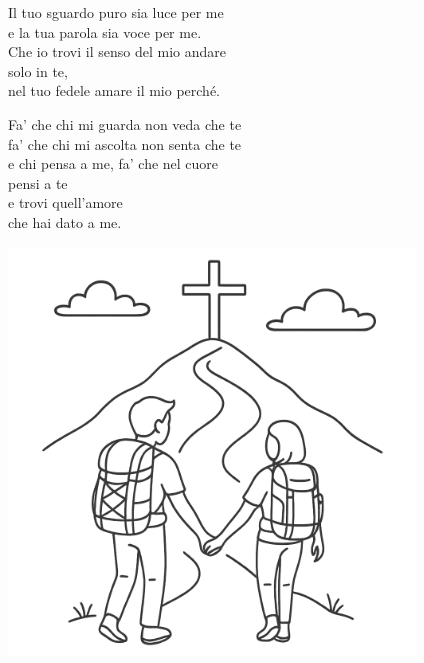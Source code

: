 	\begin{mystrofe}
		Il tuo sguardo puro sia luce per me \\
		e la tua parola sia voce per me. \\
		Che io trovi il senso del mio andare \\
		solo in te, \\
		nel tuo fedele amare il mio perché. \\
	\end{mystrofe}

	\begin{mystrofe}
		\ritornello{}
	\end{mystrofe}

	\begin{mystrofe}
		Fa' che chi mi guarda non veda che te \\
		fa' che chi mi ascolta non senta che te \\
		e chi pensa a me, fa' che nel cuore \\
		pensi a te \\
		 e trovi quell'amore \\
		che hai dato a me. \\
	\end{mystrofe}

	\begin{mystrofe}
		\ritornello{}
	\end{mystrofe}

\vfill
\begin{center}
\includegraphics[width=\textwidth]{src/assets/img/fine.png}
\end{center}
\vfill